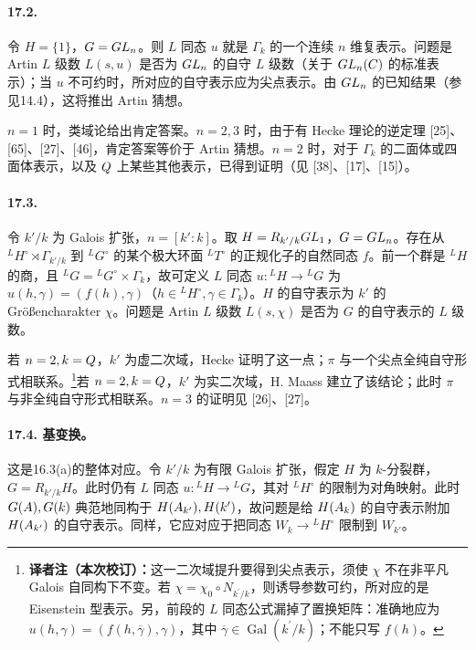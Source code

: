 \paragraph*{17.2.} 令 $H=\{1\}$，$G=GL_n$。则 $L$ 同态 $u$ 就是 $\Gamma_k$ 的一个连续 $n$ 维复表示。问题是 Artin $L$ 级数 $L(s,u)$ 是否为 $GL_n$ 的自守 $L$ 级数（关于 $GL_n(C)$ 的标准表示）；当 $u$ 不可约时，所对应的自守表示应为尖点表示。由 $GL_n$ 的已知结果（参见14.4），这将推出 Artin 猜想。

$n=1$ 时，类域论给出肯定答案。$n=2,3$ 时，由于有 Hecke 理论的逆定理 [25]、[65]、[27]、[46]，肯定答案等价于 Artin 猜想。$n=2$ 时，对于 $\Gamma_k$ 的二面体或四面体表示，以及 $Q$ 上某些其他表示，已得到证明（见 [38]、[17]、[15]）。

\paragraph*{17.3.} 令 $k'/k$ 为 Galois 扩张，$n=[k':k]$。取 $H=R_{k'/k}GL_1$，$G=GL_n$。存在从 ${}^LH^\circ\rtimes\Gamma_{k'/k}$ 到 ${}^LG^\circ$ 的某个极大环面 ${}^LT^\circ$ 的正规化子的自然同态 $f$。前一个群是 ${}^LH$ 的商，且 ${}^LG={}^LG^\circ\times\Gamma_k$，故可定义 $L$ 同态 $u:{}^LH\to{}^LG$ 为 $u(h,\gamma)=(f(h),\gamma)$（$h\in{}^LH^\circ,\gamma\in\Gamma_k$）。$H$ 的自守表示为 $k'$ 的 Größencharakter $\chi$。问题是 Artin $L$ 级数 $L(s,\chi)$ 是否为 $G$ 的自守表示的 $L$ 级数。

若 $n=2,k=Q$，$k'$ 为虚二次域，Hecke 证明了这一点；$\pi$ 与一个尖点全纯自守形式相联系。\footnote{\textbf{译者注（本次校订）：}这一二次域提升要得到尖点表示，须使 $\chi$ 不在非平凡 Galois 自同构下不变。若 $\chi=\chi_0\circ N_{k^{\prime}/k}$，则诱导参数可约，所对应的是 Eisenstein 型表示。另，前段的 $L$ 同态公式漏掉了置换矩阵：准确地应为 $u(h,\gamma)=(f(h,\overline\gamma),\gamma)$，其中 $\overline\gamma\in\operatorname{Gal}(k^{\prime}/k)$；不能只写 $f(h)$。}若 $n=2,k=Q$，$k'$ 为实二次域，H. Maass 建立了该结论；此时 $\pi$ 与非全纯自守形式相联系。$n=3$ 的证明见 [26]、[27]。

\paragraph*{17.4. 基变换。}
这是16.3(a)的整体对应。令 $k'/k$ 为有限 Galois 扩张，假定 $H$ 为 $k$-分裂群，$G=R_{k'/k}H$。此时仍有 $L$ 同态 $u:{}^LH\to{}^LG$，其对 ${}^LH^\circ$ 的限制为对角映射。此时 $G(A),G(k)$ 典范地同构于 $H(A_{k'}),H(k')$，故问题是给 $H(A_k)$ 的自守表示附加 $H(A_{k'})$ 的自守表示。同样，它应对应于把同态 $W_k\to{}^LH^\circ$ 限制到 $W_{k'}$。

